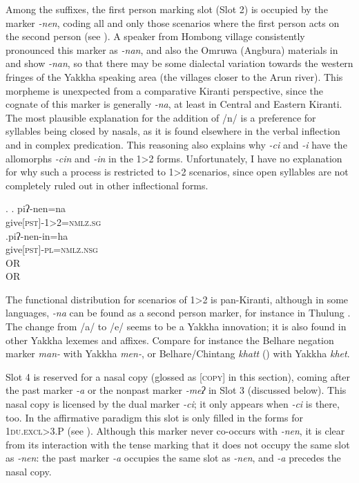  
Among the suffixes, the first person marking slot (Slot 2) is occupied by the marker \emph{-nen}, coding all and only those scenarios where  the first person acts on the second person (see \Next). A speaker from Hombong  village consistently pronounced this marker as \emph{-nan}, and also the Omruwa (Angbura) materials in \citet{Driem1994The-Yakkha} and  \citet{Gvozdanovic1987How} show \emph{-nan}, so that there may be some dialectal variation towards the western fringes of the Yakkha speaking area (the villages closer to the Arun river). This morpheme is unexpected from a comparative Kiranti perspective, since the cognate of this marker is generally  \emph{-na}, at least in Central and Eastern Kiranti. The most plausible explanation for the addition of /n/ is  a preference for  syllables being closed by nasals, as it is found elsewhere in the verbal inflection and in complex predication. This reasoning also explains why \emph{-ci} and \emph{-i} have the allomorphs \emph{-cin} and \emph{-in} in the 1>2 forms.  Unfortunately, I have no explanation for why such a process is  restricted to 1>2 scenarios, since open syllables are not completely ruled out in other inflectional forms.


\ex. \ag. piʔ-nen=na\\
	give{\scshape [pst]-1>2=nmlz.sg}\\
	\bg.\label{ex-nenin}piʔ-nen-in=ha\\
	give{\scshape [pst]-pl=nmlz.nsg}\\
	 OR\\
	 OR\\

The functional distribution for scenarios of 1>2 is  pan-Kiranti, although in some languages, \emph{-na} can be found as a second person marker, for instance in Thulung \citep[148]{Lahaussois2002Thulung}. The change from /a/ to /e/ seems to be a Yakkha innovation; it is also found in other Yakkha lexemes and affixes. Compare for instance the Belhare negation marker \emph{man-} with Yakkha \emph{men-}, or Belhare/Chintang \emph{khatt} () with Yakkha \emph{khet}. 
	


Slot 4 is reserved for a nasal copy (glossed as {\scshape [copy]} in this section), coming after the past marker  \emph{-a} or the nonpast marker \emph{-meʔ} in Slot 3 (discussed below). This nasal copy is licensed by the dual marker \emph{-ci}; it only appears  when \emph{-ci} is there, too. In the affirmative paradigm this slot is only filled in the forms for {\scshape 1du.excl>3.P} (see \Next). Although this marker never co-occurs with \emph{-nen}, it is clear from its interaction with the tense marking that it does not occupy the same slot as \emph{-nen}: the past marker \emph{-a} occupies the same slot as \emph{-nen}, and \emph{-a} precedes the nasal copy.

